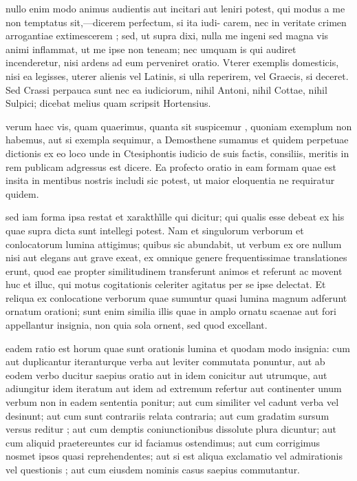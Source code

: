  nullo enim modo animus audientis aut incitari aut leniri potest, qui modus a me non temptatus sit,—dicerem perfectum, si ita iudi- carem, nec in veritate crimen arrogantiae extimescerem ; sed, ut supra dixi, nulla me ingeni sed magna vis animi inflammat, ut me ipse non teneam; nec umquam is qui audiret incenderetur, nisi ardens ad eum perveniret oratio. Vterer exemplis domesticis, nisi ea legisses, uterer alienis vel Latinis, si ulla reperirem, vel Graecis, si deceret. Sed Crassi perpauca sunt nec ea iudiciorum, nihil Antoni, nihil Cottae, nihil Sulpici; dicebat melius quam scripsit Hortensius.

 verum haec vis, quam quaerimus, quanta sit suspicemur , quoniam exemplum non habemus, aut si exempla sequimur, a Demosthene sumamus et quidem perpetuae dictionis ex eo loco unde in Ctesiphontis iudicio de suis factis, consiliis, meritis in rem publicam adgressus est dicere. Ea profecto oratio in eam formam quae est insita in mentibus nostris includi sic potest, ut maior eloquentia ne requiratur quidem.

 sed iam forma ipsa restat et xarakth\r ille qui dicitur; qui qualis esse debeat ex his quae supra dicta sunt intellegi potest. Nam et singulorum verborum et conlocatorum lumina attigimus; quibus sic abundabit, ut verbum ex ore nullum nisi aut elegans aut grave exeat, ex omnique genere frequentissimae translationes erunt, quod eae propter similitudinem transferunt animos et referunt ac movent huc et illuc, qui motus cogitationis celeriter agitatus per se ipse delectat. Et reliqua ex conlocatione verborum quae sumuntur quasi lumina magnum adferunt ornatum orationi; sunt enim similia illis quae in amplo ornatu scaenae aut fori appellantur insignia, non quia sola ornent, sed quod excellant.

 eadem ratio est horum quae sunt orationis lumina et quodam modo insignia: cum aut duplicantur iteranturque verba aut leviter commutata ponuntur, aut ab eodem verbo ducitur saepius oratio aut in idem conicitur aut utrumque, aut adiungitur idem iteratum aut idem ad extremum refertur aut continenter unum verbum non in eadem sententia ponitur; aut cum similiter vel cadunt verba vel desinunt; aut cum sunt contrariis relata contraria; aut cum gradatim sursum versus reditur ; aut cum demptis coniunctionibus dissolute plura dicuntur; aut cum aliquid praetereuntes cur id faciamus ostendimus; aut cum corrigimus nosmet ipsos quasi reprehendentes; aut si est aliqua exclamatio vel admirationis vel questionis ; aut cum eiusdem nominis casus saepius commutantur.

